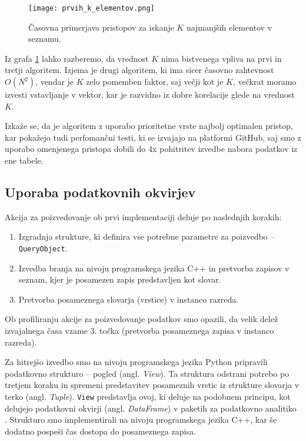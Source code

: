 \documentclass[a4paper,12pt,openright]{book}
\begin{document}
        \begin{figure}[H]
            \centerline{\texttt{[image: prvih\_k\_elementov.png]}}
            \caption{Časovna primerjava pristopov za iskanje $K$ najmanjših elementov v seznamu.}
            \label{sl:k_smallest}
        \end{figure}

        \noindent
        Iz grafa \ref{sl:k_smallest} lahko razberemo, da vrednost $K$ nima bistvenega vpliva na prvi in tretji algoritem. Izjema je drugi algoritem, ki ima sicer časovno zahtevnost $O(N^2)$, vendar je $K$ zelo pomemben faktor, saj večji kot je $K$, večkrat moramo izvesti vstavljanje v vektor, kar je razvidno iz dobre korelacije glede na vrednost $K$.

        Izkaže se, da je algoritem z uporabo prioritetne vrste najbolj optimalen pristop, kar pokažejo tudi perfomančni testi, ki se izvajajo na platformi GitHub, saj smo z uporabo omenjenega pristopa dobili do 4x pohitritev izvedbe nabora podatkov iz ene tabele.

        \subsection{Uporaba podatkovnih okvirjev}
        \label{using_df}

        Akcija za poizvedovanje ob prvi implementaciji deluje po naslednjih korakih:
        \begin{enumerate}
            \item Izgradnja strukture, ki definira vse potrebne parametre za poizvedbo – {\tt QueryObject}.
            \item Izvedba branja na nivoju programskega jezika C++ in pretvorba zapisov v seznam, kjer je posamezen zapis predstavljen kot slovar.
            \item Pretvorba posameznega slovarja (vrstice) v instanco razreda.
        \end{enumerate}

        \noindent
        Ob profiliranju akcije za poizvedovanje podatkov smo opazili, da velik delež izvajalnega časa vzame 3. točka  (pretvorba posameznega zapisa v instanco razreda).

        Za hitrejšo izvedbo smo na nivoju programskega jezika Python pripravili podatkovno strukturo – pogled (angl. \textit{View}). Ta struktura odstrani potrebo po tretjem koraku in spremeni predstavitev posameznih vrstic iz strukture slovarja v terko (angl. \textit{Tuple}). {\tt View} predstavlja ovoj, ki deluje na podobnem principu, kot delujejo podatkovni okvirji (angl. \textit{DataFrame}) v paketih za podatkovno analitiko \cite{mckinney2010data}. Strukturo smo implementirali na nivoju programskega jezika C++, kar še dodatno pospeši čas dostopa do posameznega zapisa.
\end{document}
